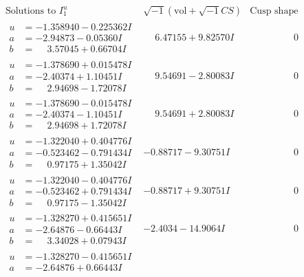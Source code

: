 \documentclass[1p]{elsarticle_modified}
\theoremstyle{definition}
\newcommand{\I}{\sqrt{-1}}
\begin{document}
$$\begin{array}{c|c|c}
\text{Solutions to }I^u_{1}& \I (\text{vol} + \sqrt{-1}CS) & \text{Cusp shape}\\
 \hline 
\begin{aligned}
u &= -1.358940 - 0.225362 I \\
a &= -2.94873 - 0.05360 I \\
b &= \phantom{-}3.57045 + 0.66704 I\end{aligned}
 & \phantom{-}6.47155 + 9.82570 I & \phantom{-0.000000 } 0 \\ \hline\begin{aligned}
u &= -1.378690 + 0.015478 I \\
a &= -2.40374 + 1.10451 I \\
b &= \phantom{-}2.94698 - 1.72078 I\end{aligned}
 & \phantom{-}9.54691 - 2.80083 I & \phantom{-0.000000 } 0 \\ \hline\begin{aligned}
u &= -1.378690 - 0.015478 I \\
a &= -2.40374 - 1.10451 I \\
b &= \phantom{-}2.94698 + 1.72078 I\end{aligned}
 & \phantom{-}9.54691 + 2.80083 I & \phantom{-0.000000 } 0 \\ \hline\begin{aligned}
u &= -1.322040 + 0.404776 I \\
a &= -0.523462 - 0.791434 I \\
b &= \phantom{-}0.97175 + 1.35042 I\end{aligned}
 & -0.88717 - 9.30751 I & \phantom{-0.000000 } 0 \\ \hline\begin{aligned}
u &= -1.322040 - 0.404776 I \\
a &= -0.523462 + 0.791434 I \\
b &= \phantom{-}0.97175 - 1.35042 I\end{aligned}
 & -0.88717 + 9.30751 I & \phantom{-0.000000 } 0 \\ \hline\begin{aligned}
u &= -1.328270 + 0.415651 I \\
a &= -2.64876 - 0.66443 I \\
b &= \phantom{-}3.34028 + 0.07943 I\end{aligned}
 & -2.4034 - 14.9064 I & \phantom{-0.000000 } 0 \\ \hline\begin{aligned}
u &= -1.328270 - 0.415651 I \\
a &= -2.64876 + 0.66443 I \\

\end{aligned}
\end{array}$$
\end{document}
